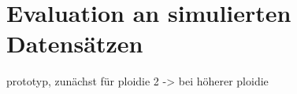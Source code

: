 \chapter{Evaluation an simulierten Datensätzen} \label{sec:}
prototyp, zunächst für ploidie 2 -> bei höherer ploidie

\section{} \label{sec:}
\subsection{} \label{subsec:}